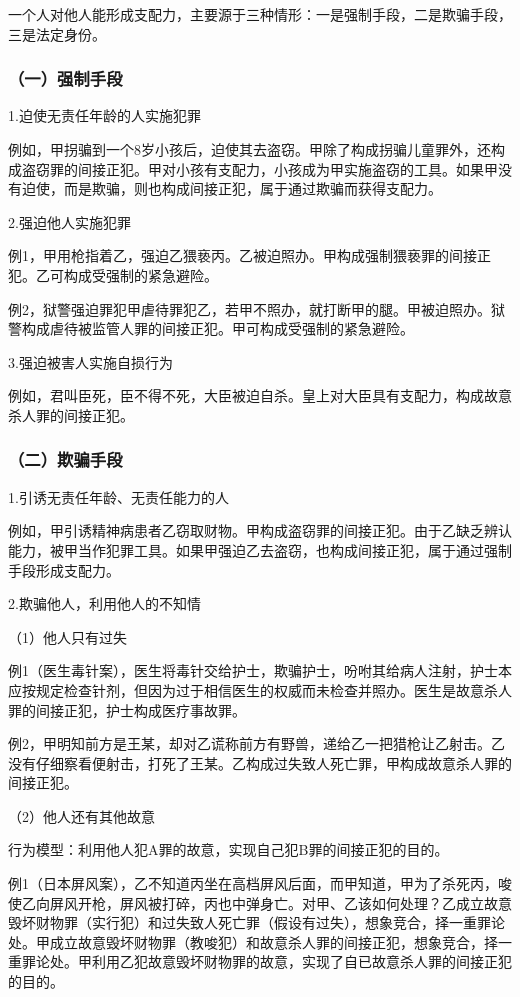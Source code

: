 一个人对他人能形成支配力，主要源于三种情形：一是强制手段，二是欺骗手段，三是法定身份。

\subsubsection*{（一）强制手段}

1.迫使无责任年龄的人实施犯罪

例如，甲拐骗到一个8岁小孩后，迫使其去盗窃。甲除了构成拐骗儿童罪外，还构成盗窃罪的间接正犯。甲对小孩有支配力，小孩成为甲实施盗窃的工具。如果甲没有迫使，而是欺骗，则也构成间接正犯，属于通过欺骗而获得支配力。

2.强迫他人实施犯罪

例1，甲用枪指着乙，强迫乙猥亵丙。乙被迫照办。甲构成强制猥亵罪的间接正犯。乙可构成受强制的紧急避险。

例2，狱警强迫罪犯甲虐待罪犯乙，若甲不照办，就打断甲的腿。甲被迫照办。狱警构成虐待被监管人罪的间接正犯。甲可构成受强制的紧急避险。

3.强迫被害人实施自损行为

例如，君叫臣死，臣不得不死，大臣被迫自杀。皇上对大臣具有支配力，构成故意杀人罪的间接正犯。

\subsubsection*{（二）欺骗手段}

1.引诱无责任年龄、无责任能力的人

例如，甲引诱精神病患者乙窃取财物。甲构成盗窃罪的间接正犯。由于乙缺乏辨认能力，被甲当作犯罪工具。如果甲强迫乙去盗窃，也构成间接正犯，属于通过强制手段形成支配力。

2.欺骗他人，利用他人的不知情

（1）他人只有过失

例1（医生毒针案），医生将毒针交给护士，欺骗护士，吩咐其给病人注射，护士本应按规定检查针剂，但因为过于相信医生的权威而未检查并照办。医生是故意杀人罪的间接正犯，护士构成医疗事故罪。

例2，甲明知前方是王某，却对乙谎称前方有野兽，递给乙一把猎枪让乙射击。乙没有仔细察看便射击，打死了王某。乙构成过失致人死亡罪，甲构成故意杀人罪的间接正犯。

（2）他人还有其他故意

行为模型：利用他人犯A罪的故意，实现自己犯B罪的间接正犯的目的。

例1（日本屏风案），乙不知道丙坐在高档屏风后面，而甲知道，甲为了杀死丙，唆使乙向屏风开枪，屏风被打碎，丙也中弹身亡。对甲、乙该如何处理？乙成立故意毁坏财物罪（实行犯）和过失致人死亡罪（假设有过失），想象竞合，择一重罪论处。甲成立故意毁坏财物罪（教唆犯）和故意杀人罪的间接正犯，想象竞合，择一重罪论处。甲利用乙犯故意毁坏财物罪的故意，实现了自已故意杀人罪的间接正犯的目的。

